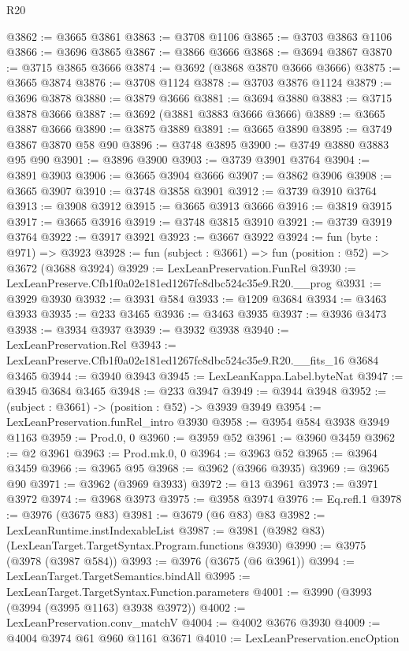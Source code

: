 \begin{lexlean}{R20}
\begin{coremodule}
@3862 := @3665 @3861
@3863 := @3708 @1106
@3865 := @3703 @3863 @1106
@3866 := @3696 @3865
@3867 := @3866 @3666
@3868 := @3694 @3867
@3870 := @3715 @3865 @3666
@3874 := @3692 (@3868 @3870 @3666 @3666)
@3875 := @3665 @3874
@3876 := @3708 @1124
@3878 := @3703 @3876 @1124
@3879 := @3696 @3878
@3880 := @3879 @3666
@3881 := @3694 @3880
@3883 := @3715 @3878 @3666
@3887 := @3692 (@3881 @3883 @3666 @3666)
@3889 := @3665 @3887 @3666
@3890 := @3875 @3889
@3891 := @3665 @3890
@3895 := @3749 @3867 @3870 @58 @90
@3896 := @3748 @3895
@3900 := @3749 @3880 @3883 @95 @90
@3901 := @3896 @3900
@3903 := @3739 @3901 @3764
@3904 := @3891 @3903
@3906 := @3665 @3904 @3666
@3907 := @3862 @3906
@3908 := @3665 @3907
@3910 := @3748 @3858 @3901
@3912 := @3739 @3910 @3764
@3913 := @3908 @3912
@3915 := @3665 @3913 @3666
@3916 := @3819 @3915
@3917 := @3665 @3916
@3919 := @3748 @3815 @3910
@3921 := @3739 @3919 @3764
@3922 := @3917 @3921
@3923 := @3667 @3922
@3924 := fun (byte : @971) => @3923
@3928 := fun (subject : @3661) => fun (position : @52) => @3672 (@3688 @3924)
@3929 := LexLeanPreservation.FunRel
@3930 := LexLeanPreserve.Cfb1f0a02e181ed1267fc8dbc524c35e9.R20.__prog
@3931 := @3929 @3930
@3932 := @3931 @584
@3933 := @1209 @3684
@3934 := @3463 @3933
@3935 := @233 @3465
@3936 := @3463 @3935
@3937 := @3936 @3473
@3938 := @3934 @3937
@3939 := @3932 @3938
@3940 := LexLeanPreservation.Rel
@3943 := LexLeanPreserve.Cfb1f0a02e181ed1267fc8dbc524c35e9.R20.__fits_16 @3684 @3465
@3944 := @3940 @3943
@3945 := LexLeanKappa.Label.byteNat
@3947 := @3945 @3684 @3465
@3948 := @233 @3947
@3949 := @3944 @3948
@3952 := (subject : @3661) -> (position : @52) -> @3939 @3949
@3954 := LexLeanPreservation.funRel_intro @3930
@3958 := @3954 @584 @3938 @3949 @1163
@3959 := Prod.{0, 0}
@3960 := @3959 @52
@3961 := @3960 @3459
@3962 := @2 @3961
@3963 := Prod.mk.{0, 0}
@3964 := @3963 @52
@3965 := @3964 @3459
@3966 := @3965 @95
@3968 := @3962 (@3966 @3935)
@3969 := @3965 @90
@3971 := @3962 (@3969 @3933)
@3972 := @13 @3961
@3973 := @3971 @3972
@3974 := @3968 @3973
@3975 := @3958 @3974
@3976 := Eq.refl.{1}
@3978 := @3976 (@3675 @83)
@3981 := @3679 (@6 @83) @83
@3982 := LexLeanRuntime.instIndexableList
@3987 := @3981 (@3982 @83) (LexLeanTarget.TargetSyntax.Program.functions @3930)
@3990 := @3975 (@3978 (@3987 @584))
@3993 := @3976 (@3675 (@6 @3961))
@3994 := LexLeanTarget.TargetSemantics.bindAll
@3995 := LexLeanTarget.TargetSyntax.Function.parameters
@4001 := @3990 (@3993 (@3994 (@3995 @1163) @3938 @3972))
@4002 := LexLeanPreservation.conv_matchV
@4004 := @4002 @3676 @3930
@4009 := @4004 @3974 @61 @960 @1161 @3671
@4010 := LexLeanPreservation.encOption

\end{coremodule}
\end{lexlean}
